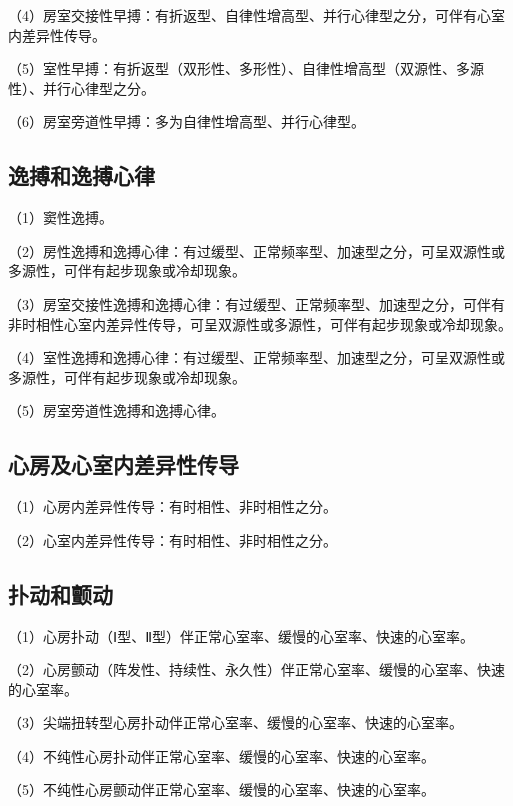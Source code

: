 （4）房室交接性早搏：有折返型、自律性增高型、并行心律型之分，可伴有心室内差异性传导。

（5）室性早搏：有折返型（双形性、多形性）、自律性增高型（双源性、多源性）、并行心律型之分。

（6）房室旁道性早搏：多为自律性增高型、并行心律型。

\protect\hypertarget{text00057.htmlux5cux23subid692}{}{}

\subsection{逸搏和逸搏心律}

（1）窦性逸搏。

（2）房性逸搏和逸搏心律：有过缓型、正常频率型、加速型之分，可呈双源性或多源性，可伴有起步现象或冷却现象。

（3）房室交接性逸搏和逸搏心律：有过缓型、正常频率型、加速型之分，可伴有非时相性心室内差异性传导，可呈双源性或多源性，可伴有起步现象或冷却现象。

（4）室性逸搏和逸搏心律：有过缓型、正常频率型、加速型之分，可呈双源性或多源性，可伴有起步现象或冷却现象。

（5）房室旁道性逸搏和逸搏心律。

\protect\hypertarget{text00057.htmlux5cux23subid693}{}{}

\subsection{心房及心室内差异性传导}

（1）心房内差异性传导：有时相性、非时相性之分。

（2）心室内差异性传导：有时相性、非时相性之分。

\protect\hypertarget{text00057.htmlux5cux23subid694}{}{}

\subsection{扑动和颤动}

（1）心房扑动（Ⅰ型、Ⅱ型）伴正常心室率、缓慢的心室率、快速的心室率。

（2）心房颤动（阵发性、持续性、永久性）伴正常心室率、缓慢的心室率、快速的心室率。

（3）尖端扭转型心房扑动伴正常心室率、缓慢的心室率、快速的心室率。

（4）不纯性心房扑动伴正常心室率、缓慢的心室率、快速的心室率。

（5）不纯性心房颤动伴正常心室率、缓慢的心室率、快速的心室率。

